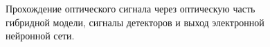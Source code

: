 \begin{figure}[h]
	\caption{Прохождение оптического сигнала через оптическую часть гибридной модели, сигналы детекторов и выход электронной нейронной сети.}
	\label{ris:ModelWork2}
\end{figure}
